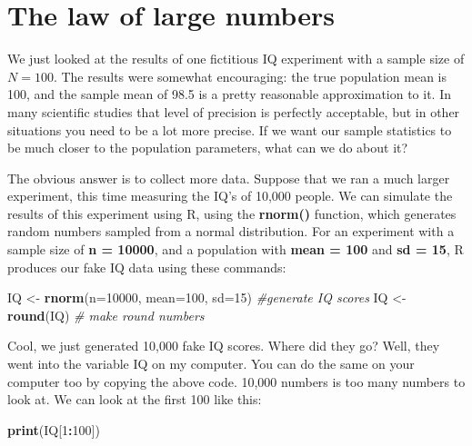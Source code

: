 \documentclass[
]{book}
\newenvironment{Shaded}{\begin{snugshade}}{\end{snugshade}}
\newcommand{\CommentTok}[1]{\textcolor[rgb]{0.56,0.35,0.01}{\textit{#1}}}
\newcommand{\DataTypeTok}[1]{\textcolor[rgb]{0.13,0.29,0.53}{#1}}
\newcommand{\DecValTok}[1]{\textcolor[rgb]{0.00,0.00,0.81}{#1}}
\newcommand{\KeywordTok}[1]{\textcolor[rgb]{0.13,0.29,0.53}{\textbf{#1}}}
\newcommand{\NormalTok}[1]{#1}
\newcommand{\OperatorTok}[1]{\textcolor[rgb]{0.81,0.36,0.00}{\textbf{#1}}}
\newcommand{\StringTok}[1]{\textcolor[rgb]{0.31,0.60,0.02}{#1}}
\begin{document}
\hypertarget{the-law-of-large-numbers}{%
\section{The law of large numbers}\label{the-law-of-large-numbers}}

We just looked at the results of one fictitious IQ experiment with a sample size of \(N=100\). The results were somewhat encouraging: the true population mean is 100, and the sample mean of 98.5 is a pretty reasonable approximation to it. In many scientific studies that level of precision is perfectly acceptable, but in other situations you need to be a lot more precise. If we want our sample statistics to be much closer to the population parameters, what can we do about it?

The obvious answer is to collect more data. Suppose that we ran a much larger experiment, this time measuring the IQ's of 10,000 people. We can simulate the results of this experiment using R, using the \textbf{rnorm()} function, which generates random numbers sampled from a normal distribution. For an experiment with a sample size of \textbf{n = 10000}, and a population with \textbf{mean = 100} and \textbf{sd = 15}, R produces our fake IQ data using these commands:

\begin{Shaded}
\begin{Highlighting}[]
\NormalTok{IQ <-}\StringTok{ }\KeywordTok{rnorm}\NormalTok{(}\DataTypeTok{n=}\DecValTok{10000}\NormalTok{, }\DataTypeTok{mean=}\DecValTok{100}\NormalTok{, }\DataTypeTok{sd=}\DecValTok{15}\NormalTok{) }\CommentTok{#generate IQ scores}
\NormalTok{IQ <-}\StringTok{ }\KeywordTok{round}\NormalTok{(IQ) }\CommentTok{# make round numbers}
\end{Highlighting}
\end{Shaded}

Cool, we just generated 10,000 fake IQ scores. Where did they go? Well, they went into the variable IQ on my computer. You can do the same on your computer too by copying the above code. 10,000 numbers is too many numbers to look at. We can look at the first 100 like this:

\begin{Shaded}
\begin{Highlighting}[]
\KeywordTok{print}\NormalTok{(IQ[}\DecValTok{1}\OperatorTok{:}\DecValTok{100}\NormalTok{])}
\end{Highlighting}
\end{Shaded}
\end{document}
